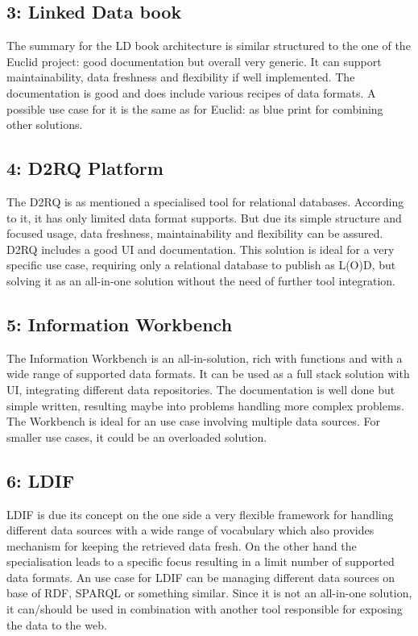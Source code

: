 \subsection*{3: Linked Data book}
The summary for the LD book architecture is similar structured to the one of the Euclid project: good documentation but overall very generic. It can support maintainability, data freshness and flexibility if well implemented. The documentation is good and does include various recipes of data formats.
A possible use case for it is the same as for Euclid: as blue print for combining other solutions.

\subsection*{4: D2RQ Platform}
The D2RQ is as mentioned a specialised tool for relational databases. According to it, it has only limited data format supports. But due its simple structure and focused usage, data freshness, maintainability and flexibility can be assured. D2RQ includes a good UI and documentation.
This solution is ideal for a very specific use case, requiring only a relational database to publish as L(O)D, but solving it as an all-in-one solution without the need of further tool integration.

\subsection*{5: Information Workbench}
The Information Workbench is an all-in-solution, rich with functions and with a wide range of supported data formats. It can be used as a full stack solution with UI, integrating different data repositories. The documentation is well done but simple written, resulting maybe into problems handling more complex problems.
The Workbench is ideal for an use case involving multiple data sources. For smaller use cases, it could be an overloaded solution.

\subsection*{6: LDIF}
LDIF is due its concept on the one side a very flexible framework for handling different data sources with a wide range of vocabulary which also provides mechanism for keeping the retrieved data fresh. On the other hand the specialisation leads to a specific focus resulting in a limit number of supported data formats.
An use case for LDIF can be managing different data sources on base of RDF, SPARQL or something similar. Since it is not an all-in-one solution, it can/should be used in combination with another tool responsible for exposing the data to the web.

